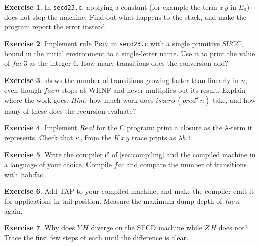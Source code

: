 \documentclass[11pt,a4paper]{article}
\newcommand{\rul}[1]{\textsc{#1}}
\newcommand{\ins}[1]{\textsf{#1}}
\newcommand{\Real}{\mathit{Real}}
\theoremstyle{definition}
\newtheorem{exercise}{Exercise}
\theoremstyle{plain}
\begin{document}
\begin{exercise}\label{ex:stuck}
In \texttt{secd23.c}, applying a constant (for example the term $x\,y$ in
$E_0$) does not stop the machine. Find out what happens to the stack, and
make the program report the error instead.
\end{exercise}

\begin{exercise}\label{ex:prims}
Implement rule \rul{Prim} in \texttt{secd23.c} with a single primitive
$\mathit{SUCC}$, bound in the initial environment to a single-letter name.
Use it to print the value of $\mathit{fac}\,\underline{3}$ as the integer $6$.
How many transitions does the conversion add?
\end{exercise}

\begin{exercise}\label{ex:quadratic}
 shows the number of transitions growing faster than linearly
in $n$, even though $\mathit{fac}\,\underline{n}$ stops at WHNF and never
multiplies out its result. Explain where the work goes.
\emph{Hint:} how much work does
$\mathit{iszero}\,(\mathit{pred}^k\,\underline{n})$ take, and how many of
these does the recursion evaluate?
\end{exercise}

\begin{exercise}
Implement $\Real$ for the C program: print a closure as the $\lambda$-term it
represents. Check that $\kappa_2$ from the $K\,x\,y$ trace prints as
$\lambda b.4$.
\end{exercise}

\begin{exercise}
Write the compiler $\mathcal{C}$ of \cref{sec:compiling} and the compiled
machine in a language of your choice. Compile $\mathit{fac}$ and compare the
number of transitions with \cref{tab:fac}.
\end{exercise}

\begin{exercise}\label{ex:tail}
Add \ins{TAP} to your compiled machine, and make the compiler emit it for
applications in tail position. Measure the maximum dump depth of
$\mathit{fac}\,\underline{n}$ again.
\end{exercise}

\begin{exercise}
Why does $Y\,H$ diverge on the SECD machine while $Z\,H$ does not? Trace the
first few steps of each until the difference is clear.
\end{exercise}
\end{document}
